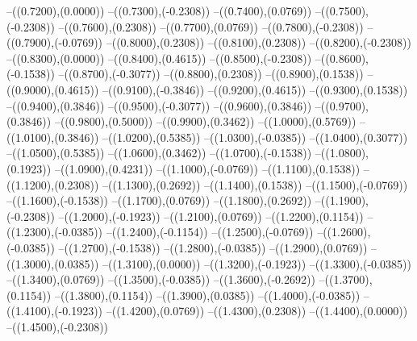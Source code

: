 {	--({\sx*(0.7200)},{\sy*(0.0000)})
	--({\sx*(0.7300)},{\sy*(-0.2308)})
	--({\sx*(0.7400)},{\sy*(0.0769)})
	--({\sx*(0.7500)},{\sy*(-0.2308)})
	--({\sx*(0.7600)},{\sy*(0.2308)})
	--({\sx*(0.7700)},{\sy*(0.0769)})
	--({\sx*(0.7800)},{\sy*(-0.2308)})
	--({\sx*(0.7900)},{\sy*(-0.0769)})
	--({\sx*(0.8000)},{\sy*(0.2308)})
	--({\sx*(0.8100)},{\sy*(0.2308)})
	--({\sx*(0.8200)},{\sy*(-0.2308)})
	--({\sx*(0.8300)},{\sy*(0.0000)})
	--({\sx*(0.8400)},{\sy*(0.4615)})
	--({\sx*(0.8500)},{\sy*(-0.2308)})
	--({\sx*(0.8600)},{\sy*(-0.1538)})
	--({\sx*(0.8700)},{\sy*(-0.3077)})
	--({\sx*(0.8800)},{\sy*(0.2308)})
	--({\sx*(0.8900)},{\sy*(0.1538)})
	--({\sx*(0.9000)},{\sy*(0.4615)})
	--({\sx*(0.9100)},{\sy*(-0.3846)})
	--({\sx*(0.9200)},{\sy*(0.4615)})
	--({\sx*(0.9300)},{\sy*(0.1538)})
	--({\sx*(0.9400)},{\sy*(0.3846)})
	--({\sx*(0.9500)},{\sy*(-0.3077)})
	--({\sx*(0.9600)},{\sy*(0.3846)})
	--({\sx*(0.9700)},{\sy*(0.3846)})
	--({\sx*(0.9800)},{\sy*(0.5000)})
	--({\sx*(0.9900)},{\sy*(0.3462)})
	--({\sx*(1.0000)},{\sy*(0.5769)})
	--({\sx*(1.0100)},{\sy*(0.3846)})
	--({\sx*(1.0200)},{\sy*(0.5385)})
	--({\sx*(1.0300)},{\sy*(-0.0385)})
	--({\sx*(1.0400)},{\sy*(0.3077)})
	--({\sx*(1.0500)},{\sy*(0.5385)})
	--({\sx*(1.0600)},{\sy*(0.3462)})
	--({\sx*(1.0700)},{\sy*(-0.1538)})
	--({\sx*(1.0800)},{\sy*(0.1923)})
	--({\sx*(1.0900)},{\sy*(0.4231)})
	--({\sx*(1.1000)},{\sy*(-0.0769)})
	--({\sx*(1.1100)},{\sy*(0.1538)})
	--({\sx*(1.1200)},{\sy*(0.2308)})
	--({\sx*(1.1300)},{\sy*(0.2692)})
	--({\sx*(1.1400)},{\sy*(0.1538)})
	--({\sx*(1.1500)},{\sy*(-0.0769)})
	--({\sx*(1.1600)},{\sy*(-0.1538)})
	--({\sx*(1.1700)},{\sy*(0.0769)})
	--({\sx*(1.1800)},{\sy*(0.2692)})
	--({\sx*(1.1900)},{\sy*(-0.2308)})
	--({\sx*(1.2000)},{\sy*(-0.1923)})
	--({\sx*(1.2100)},{\sy*(0.0769)})
	--({\sx*(1.2200)},{\sy*(0.1154)})
	--({\sx*(1.2300)},{\sy*(-0.0385)})
	--({\sx*(1.2400)},{\sy*(-0.1154)})
	--({\sx*(1.2500)},{\sy*(-0.0769)})
	--({\sx*(1.2600)},{\sy*(-0.0385)})
	--({\sx*(1.2700)},{\sy*(-0.1538)})
	--({\sx*(1.2800)},{\sy*(-0.0385)})
	--({\sx*(1.2900)},{\sy*(0.0769)})
	--({\sx*(1.3000)},{\sy*(0.0385)})
	--({\sx*(1.3100)},{\sy*(0.0000)})
	--({\sx*(1.3200)},{\sy*(-0.1923)})
	--({\sx*(1.3300)},{\sy*(-0.0385)})
	--({\sx*(1.3400)},{\sy*(0.0769)})
	--({\sx*(1.3500)},{\sy*(-0.0385)})
	--({\sx*(1.3600)},{\sy*(-0.2692)})
	--({\sx*(1.3700)},{\sy*(0.1154)})
	--({\sx*(1.3800)},{\sy*(0.1154)})
	--({\sx*(1.3900)},{\sy*(0.0385)})
	--({\sx*(1.4000)},{\sy*(-0.0385)})
	--({\sx*(1.4100)},{\sy*(-0.1923)})
	--({\sx*(1.4200)},{\sy*(0.0769)})
	--({\sx*(1.4300)},{\sy*(0.2308)})
	--({\sx*(1.4400)},{\sy*(0.0000)})
	--({\sx*(1.4500)},{\sy*(-0.2308)})
}

